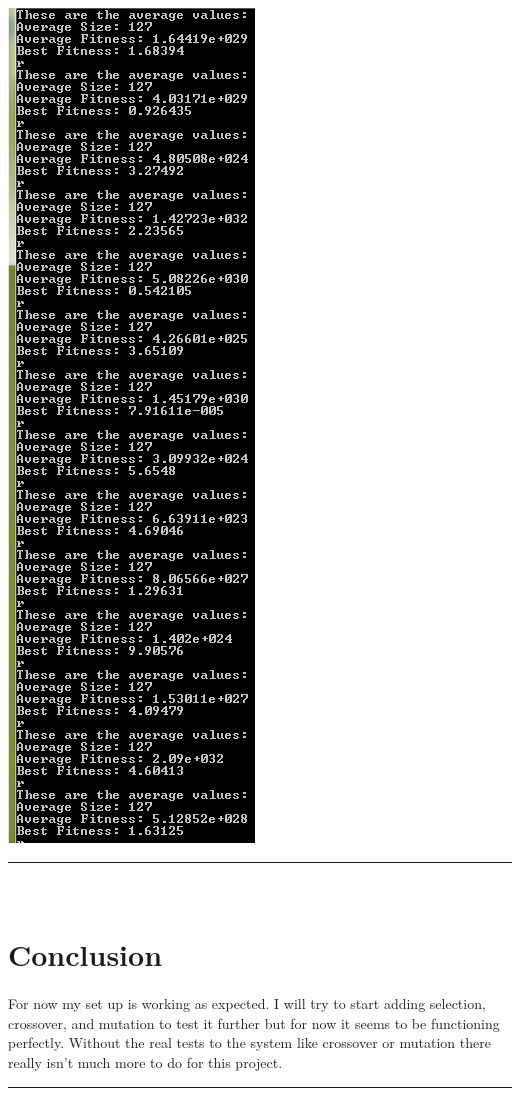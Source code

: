 \documentclass[paper=a4, fontsize=11pt]{scrartcl} %
\numberwithin{equation}{section} %
\numberwithin{figure}{section} %
\numberwithin{table}{section} %
\newcommand{\horrule}[1]{\rule{\linewidth}{#1}} %
\begin{document}
\includegraphics{Results}


\horrule{0.5pt} \\[0.4cm] %
\section{Conclusion}


\paragraph{} For now my set up is working as expected. I will try to start adding selection, crossover, and mutation to test it further but for now it seems to be functioning perfectly. Without the real tests to the system like crossover or mutation there really isn't much more to do for this project.


\horrule{0.5pt} \\[0.4cm] %
\end{document}

